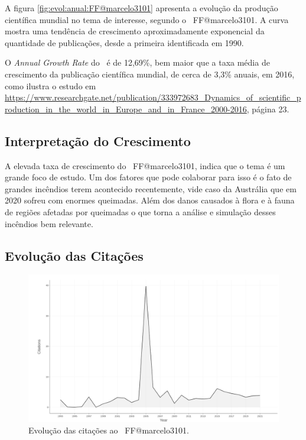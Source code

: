 A figura \ref{fig:evol:anual:FF@marcelo3101} apresenta a evolução da produção científica mundial no tema de interesse, segundo o \dataset\   FF@marcelo3101. A curva mostra uma tendência de crescimento aproximadamente exponencial da quantidade de publicações, desde a primeira identificada em 1990.

O \textit{Annual Growth Rate} do \dataset\   é de 12,69\%, bem maior que a taxa média de crescimento da publicação científica mundial, de cerca de 3,3\% anuais, em 2016, como ilustra o estudo em \url{https://www.researchgate.net/publication/333972683_Dynamics_of_scientific_production_in_the_world_in_Europe_and_in_France_2000-2016}, página 23.

\subsection{Interpretação do Crescimento} A elevada taxa de crescimento do \dataset\  FF@marcelo3101, indica que o tema é um grande foco de estudo. Um dos fatores que pode colaborar para isso é o fato de grandes incêndios terem acontecido recentemente, vide caso da Austrália que em 2020 sofreu com enormes queimadas. Além dos danos causados à flora e à fauna de regiões afetadas por queimadas o que torna a análise e simulação desses incêndios bem relevante.

\subsection{Evolução das Citações}

\begin{figure}
    \centering
    \includegraphics[width=1\textwidth]{exploratory-data-analysis/marcelo3101/PesqBibliogr/ForestFire/WoS-20221204/assets/averageCitationPerYearFFmarcelo3101.png}
    \caption{Evolução das citações ao \dataset\   FF@marcelo3101.}
    \label{fig:evol:anual:citacoes:FF@marcelo3101}
\end{figure}

